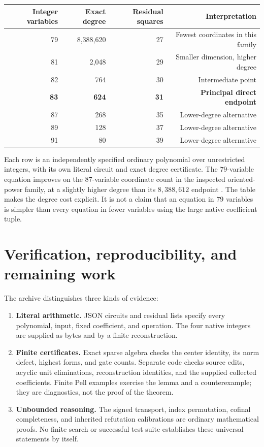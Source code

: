\documentclass[11pt]{article}
\theoremstyle{remark}
\begin{document}


\begin{center}
\begin{tabular}{rrrr}
\toprule
Integer variables & Exact degree & Residual squares & Interpretation\\
\midrule
79 & 8,388,620 & 27 & Fewest coordinates in this family\\
81 & 2,048 & 29 & Smaller dimension, higher degree\\
82 & 764 & 30 & Intermediate point\\
\textbf{83} & \textbf{624} & \textbf{31} & \textbf{Principal direct endpoint}\\
87 & 268 & 35 & Lower-degree alternative\\
89 & 128 & 37 & Lower-degree alternative\\
91 & 80 & 39 & Lower-degree alternative\\
\bottomrule
\end{tabular}
\end{center}

Each row is an independently specified ordinary polynomial over unrestricted
integers, with its own literal circuit and exact degree certificate.
The \(79\)-variable equation improves on the \(87\)-variable coordinate
count in the inspected oriented-power family, at a slightly higher
degree than its \(8{,}388{,}612\) endpoint \cite{source177}.
The table makes the degree cost explicit. It is not a claim that an
equation in \(79\) variables is simpler than every equation in fewer
variables using the large native coefficient tuple.



\section{Verification, reproducibility, and remaining work}
The archive distinguishes three kinds of evidence:
\begin{enumerate}
\item \textbf{Literal arithmetic.} JSON circuits and residual lists specify
every polynomial, input, fixed coefficient, and operation.
The four native integers are supplied as bytes and by a finite reconstruction.
\item \textbf{Finite certificates.} Exact sparse algebra checks the center
identity, its norm defect, highest forms, and gate counts.
Separate code checks source edits, acyclic unit eliminations, reconstruction
identities, and the supplied collected coefficients.
Finite Pell examples exercise the lemma and a counterexample; they are
diagnostics, not the proof of the theorem.
\item \textbf{Unbounded reasoning.} The signed transport, index permutation,
cofinal completeness, and inherited refutation calibrations are ordinary
mathematical proofs. No finite search or successful test suite establishes
these universal statements by itself.
\end{enumerate}
\end{document}
